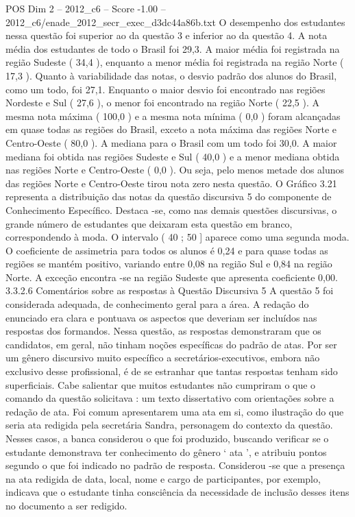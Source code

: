 \begin{textsample}{POS Dim 2 – 2012\_c6 – Score -1.00 – 2012\_c6/enade\_2012\_secr\_exec\_d3dc44a86b.txt}
O desempenho dos estudantes nessa questão foi superior ao da questão 3 e inferior ao da questão 4.
A nota média dos estudantes de todo o Brasil foi 29,3.
A maior média foi registrada na região Sudeste ( 34,4 ), enquanto a menor média foi registrada na região Norte ( 17,3 ).
Quanto à variabilidade das notas, o desvio padrão dos alunos do Brasil, como um todo, foi 27,1.
Enquanto o maior desvio foi encontrado nas regiões Nordeste e Sul ( 27,6 ), o menor foi encontrado na região Norte ( 22,5 ).
A mesma nota máxima ( 100,0 ) e a mesma nota mínima ( 0,0 ) foram alcançadas em quase todas as regiões do Brasil, exceto a nota máxima das regiões Norte e Centro-Oeste ( 80,0 ).
A mediana para o Brasil com um todo foi 30,0.
A maior mediana foi obtida nas regiões Sudeste e Sul ( 40,0 ) e a menor mediana obtida nas regiões Norte e Centro-Oeste ( 0,0 ).
Ou seja, pelo menos metade dos alunos das regiões Norte e Centro-Oeste tirou nota zero nesta questão.
O Gráfico 3.21 representa a distribuição das notas da questão discursiva 5 do componente de Conhecimento Específico.
Destaca -se, como nas demais questões discursivas, o grande número de estudantes que deixaram esta questão em branco, correspondendo à moda.
O intervalo ( 40 ; 50 ] aparece como uma segunda moda.
O coeficiente de assimetria para todos os alunos é 0,24 e para quase todas as regiões se mantém positivo, variando entre 0,08 na região Sul e 0,84 na região Norte.
A exceção encontra -se na região Sudeste que apresenta coeficiente 0,00. 3.3.2.6 Comentários sobre as respostas à Questão Discursiva 5 A questão 5 foi considerada adequada, de conhecimento geral para a área.
A redação do enunciado era clara e pontuava os aspectos que deveriam ser incluídos nas respostas dos formandos.
Nessa questão, as respostas demonstraram que os candidatos, em geral, não tinham noções específicas do padrão de atas.
Por ser um gênero discursivo muito específico a secretários-executivos, embora não exclusivo desse profissional, é de se estranhar que tantas respostas tenham sido superficiais.
Cabe salientar que muitos estudantes não cumpriram o que o comando da questão solicitava : um texto dissertativo com orientações sobre a redação de ata.
Foi comum apresentarem uma ata em si, como ilustração do que seria ata redigida pela secretária Sandra, personagem do contexto da questão.
Nesses casos, a banca considerou o que foi produzido, buscando verificar se o estudante demonstrava ter conhecimento do gênero ‘ ata ’, e atribuiu pontos segundo o que foi indicado no padrão de resposta.
Considerou -se que a presença na ata redigida de data, local, nome e cargo de participantes, por exemplo, indicava que o estudante tinha consciência da necessidade de inclusão desses itens no documento a ser redigido.

\end{textsample}

